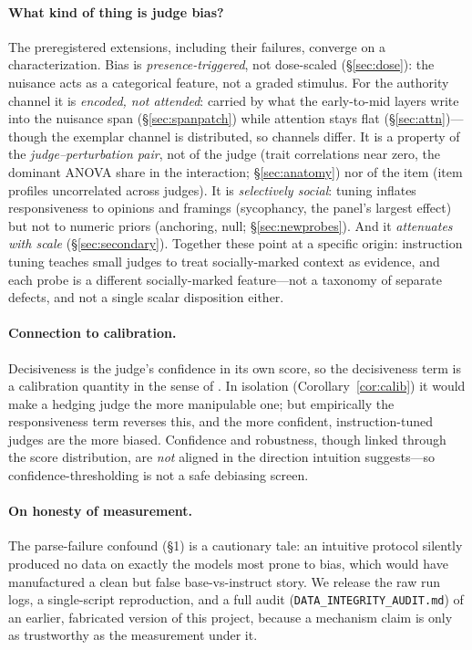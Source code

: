 \documentclass[11pt]{article}
\begin{document}
\paragraph{What kind of thing is judge bias?} The preregistered extensions,
including their failures, converge on a characterization. Bias is
\emph{presence-triggered}, not dose-scaled (\S\ref{sec:dose}): the nuisance acts as
a categorical feature, not a graded stimulus. For the authority channel it is
\emph{encoded, not attended}: carried by what the early-to-mid layers write into the
nuisance span (\S\ref{sec:spanpatch}) while attention stays flat
(\S\ref{sec:attn})---though the exemplar channel is distributed, so channels differ.
It is a property of the \emph{judge--perturbation pair}, not of the judge (trait
correlations near zero, the dominant ANOVA share in the interaction;
\S\ref{sec:anatomy}) nor of the item (item profiles uncorrelated across judges). It
is \emph{selectively social}: tuning inflates responsiveness to opinions and
framings (sycophancy, the panel's largest effect) but not to numeric priors (anchoring,
null; \S\ref{sec:newprobes}). And it \emph{attenuates with scale}
(\S\ref{sec:secondary}). Together these point at a specific origin: instruction
tuning teaches small judges to treat socially-marked context as evidence, and each
probe is a different socially-marked feature---not a taxonomy of separate defects,
and not a single scalar disposition either.

\paragraph{Connection to calibration.} Decisiveness is the judge's confidence in its own
score, so the decisiveness term is a calibration quantity in the sense of
\citet{guo2017calibration,kadavath2022know}. In isolation
(Corollary~\ref{cor:calib}) it would make a hedging judge the more manipulable one; but
empirically the responsiveness term reverses this, and the more confident,
instruction-tuned judges are the more biased. Confidence and robustness, though linked
through the score distribution, are \emph{not} aligned in the direction intuition
suggests---so confidence-thresholding is not a safe debiasing screen.

\paragraph{On honesty of measurement.} The parse-failure confound (\S1) is a cautionary
tale: an intuitive protocol silently produced no data on exactly the models most prone
to bias, which would have manufactured a clean but false base-vs-instruct story. We
release the raw run logs, a single-script reproduction, and a full audit
(\texttt{DATA\_INTEGRITY\_AUDIT.md}) of an earlier, fabricated version of this project,
because a mechanism claim is only as trustworthy as the measurement under it.
\end{document}
